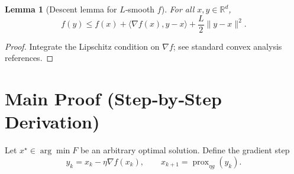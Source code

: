 \documentclass{article}
\newtheorem{lemma}{Lemma}
\begin{document}
\begin{lemma}[Descent lemma for $L$‑smooth $f$]
\label{lem:descent}
For all $x,y\in\mathbb{R}^{d}$,
\[
f(y)\le f(x)+\langle\nabla f(x),y-x\rangle+\frac{L}{2}\|y-x\|^{2}.
\tag{L2}
\]
\end{lemma}
\begin{proof}
Integrate the Lipschitz condition on $\nabla f$; see standard convex analysis references.
\end{proof}

\section*{Main Proof (Step‑by‑Step Derivation)}
Let $x^{\star}\in\arg\min F$ be an arbitrary optimal solution.  
Define the gradient step
\[
y_{k}=x_{k}-\eta\nabla f(x_{k}),\qquad x_{k+1}= \operatorname{prox}_{\eta g}(y_{k}).
\tag{P1}
\]
\end{document}
